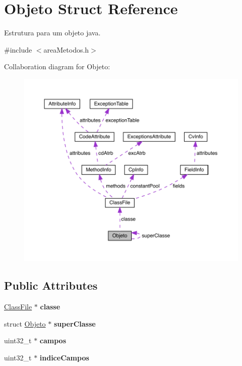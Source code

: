 \hypertarget{structObjeto}{}\section{Objeto Struct Reference}
\label{structObjeto}


Estrutura para um objeto java.  




{\ttfamily \#include $<$area\+Metodos.\+h$>$}



Collaboration diagram for Objeto\+:
\nopagebreak
\begin{figure}[H]
\begin{center}
\leavevmode
\includegraphics[width=350pt]{structObjeto__coll__graph}
\end{center}
\end{figure}
\subsection*{Public Attributes}
\begin{DoxyCompactItemize}
\item 
\mbox{\label{structObjeto_a5596a470c07ffff562f21911fc34fbf3}} 
\mbox{\hyperlink{structClassFile}{Class\+File}} $\ast$ {\bfseries classe}
\item 
\mbox{\label{structObjeto_aa7b097e2dea86e221a2c7fc1c85b6fe5}} 
struct \mbox{\hyperlink{structObjeto}{Objeto}} $\ast$ {\bfseries super\+Classe}
\item 
\mbox{\label{structObjeto_a744a42e5e611e1d2d2f65842f4117f7b}} 
uint32\+\_\+t $\ast$ {\bfseries campos}
\item 
\mbox{\label{structObjeto_a7561a3d822608137d47d2babf2dd9048}} 
uint32\+\_\+t $\ast$ {\bfseries indice\+Campos}
\end{DoxyCompactItemize}


